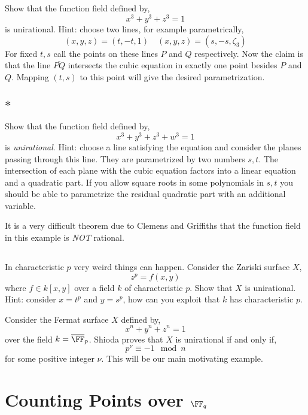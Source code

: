 \documentclass[12pt]{article}
\begin{document}
\subsection{}
Show that the function field defined by,
\[ x^3 + y^3 + z^3 = 1 \]
is unirational. Hint: choose two lines, for example parametrically,
\[ (x,y,z) = (t,-t,1) \quad (x,y,z) = (s, -s, \zeta_3) \]
For fixed $t,s$ call the points on these lines $P$ and $Q$ respectively. Now the claim is that the line $\overline{PQ}$ intersects the cubic equation in exactly one point besides $P$ and $Q$. Mapping $(t,s)$ to this point will give the desired parametrization. 

\subsection{$\ast$}

Show that the function field defined by,
\[ x^3 + y^3 + z^3 + w^3 = 1 \]
is \textit{unirational}. Hint: choose a line satisfying the equation and consider the planes passing through this line. They are parametrized by two numbers $s,t$. The intersection of each plane with the cubic equation factors into a linear equation and a quadratic part. If you allow square roots in some polynomials in $s,t$ you should be able to parametrize the residual quadratic part with an additional variable. 
\par
It is a very difficult theorem due to Clemens and Griffiths that the function field in this example is \textit{NOT} rational.

\subsection{}

In characteristic $p$ very weird things can happen. Consider the Zariski surface $X$,
\[ z^p = f(x,y) \]
where $f \in k[x,y]$ over a field $k$ of characteristic $p$. Show that $X$ is unirational. Hint: consider $x = t^p$ and $y = s^p$, how can you exploit that $k$ has characteristic $p$.

\begin{example}
Consider the Fermat surface $X$ defined by,
\[ x^n + y^n + z^n = 1 \]
over the field $k = \overline{\FF}_p$. Shioda proves \cite[Theorem III]{shioda_fermat} that $X$ is unirational if and only if,
\[ p^\nu \equiv -1 \mod n \]
for some positive integer $\nu$. This will be our main motivating example.
\end{example}

\section{Counting Points over $\FF_q$}
\end{document}
